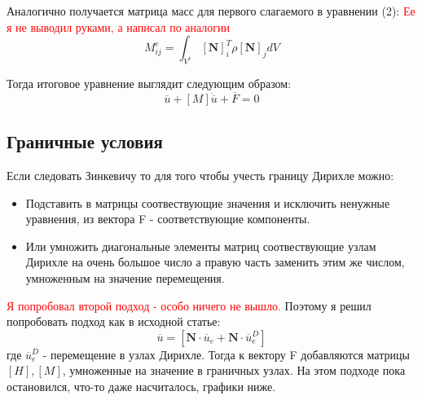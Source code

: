\documentclass[a4paper,12pt]{article}
\begin{document}
Аналогично получается матрица масс для первого слагаемого в уравнении (2):
\textcolor{red}{Ее я не выводил руками, а написал по аналогии}
\begin{equation}
    M_{ij}^e = \int_{V^e} [\textbf{N}]_i^T \rho [\textbf{N}]_j dV
\end{equation}

Тогда итоговое уравнение выглядит следующим образом:
\begin{equation}
    [H]\overline{u} + [M] \ddot{\overline{u}} + \overline{F} = 0
\end{equation}

\subsection{Граничные условия}
Если следовать Зинкевичу то для того чтобы учесть границу Дирихле можно:
\begin{itemize}
    \item Подставить в матрицы соотвествующие значения и исключить ненужные уравнения, из вектора F - соответствующие компоненты.
    \item Или умножить диагональные элементы матриц соотвествующие узлам Дирихле на очень большое число а правую часть заменить этим же числом, умноженным на значение перемещения. 
\end{itemize}
\textcolor{red}{Я попробовал второй подход - особо ничего не вышло.}
Поэтому я решил попробовать подход как в исходной статье:
\begin{equation}
    \overline{u} = [\textbf{N} \cdot \overline{u}_e + \textbf{N} \cdot \overline{u}_e^D]
\end{equation}
где $\overline{u}_e^D$ - перемещение в узлах Дирихле. Тогда к вектору F добавляются матрицы $[H], [M]$, умноженные на значение в граничных узлах. На этом подходе пока остановился, что-то даже насчиталось, графики ниже.
\end{document}
